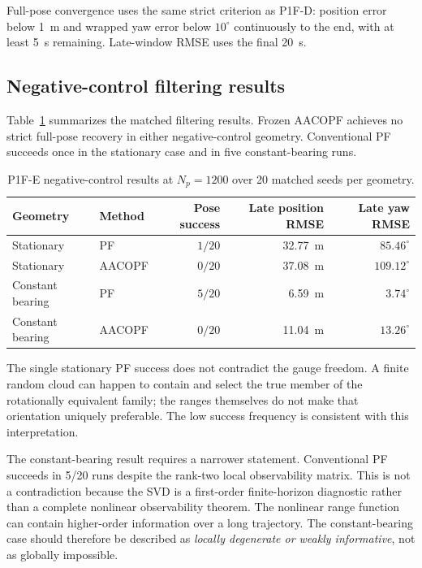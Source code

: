 Full-pose convergence uses the same strict criterion as P1F-D: position error below \SI{1}{m} and wrapped yaw error below $10^\circ$ continuously to the end, with at least \SI{5}{s} remaining. Late-window RMSE uses the final \SI{20}{s}.

\subsection{Negative-control filtering results}
Table~\ref{tab:p1fe_main} summarizes the matched filtering results. Frozen AACOPF achieves no strict full-pose recovery in either negative-control geometry. Conventional PF succeeds once in the stationary case and in five constant-bearing runs.

\begin{table}[htbp]
    \centering
    \caption{P1F-E negative-control results at $N_p=1200$ over 20 matched seeds per geometry.}
    \label{tab:p1fe_main}
    \begin{tabular}{llrrr}
        \toprule
        Geometry & Method & Pose success & Late position RMSE & Late yaw RMSE\\
        \midrule
        Stationary & PF & $1/20$ & \SI{32.77}{m} & $85.46^\circ$\\
        Stationary & AACOPF & $0/20$ & \SI{37.08}{m} & $109.12^\circ$\\
        Constant bearing & PF & $5/20$ & \SI{6.59}{m} & $3.74^\circ$\\
        Constant bearing & AACOPF & $0/20$ & \SI{11.04}{m} & $13.26^\circ$\\
        \bottomrule
    \end{tabular}
\end{table}

The single stationary PF success does not contradict the gauge freedom. A finite random cloud can happen to contain and select the true member of the rotationally equivalent family; the ranges themselves do not make that orientation uniquely preferable. The low success frequency is consistent with this interpretation.

The constant-bearing result requires a narrower statement. Conventional PF succeeds in 5/20 runs despite the rank-two local observability matrix. This is not a contradiction because the SVD is a first-order finite-horizon diagnostic rather than a complete nonlinear observability theorem. The nonlinear range function can contain higher-order information over a long trajectory. The constant-bearing case should therefore be described as \emph{locally degenerate or weakly informative}, not as globally impossible.

